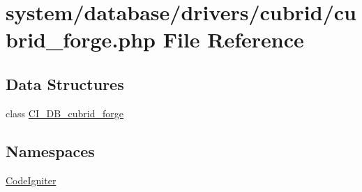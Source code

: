 \hypertarget{cubrid__forge_8php}{}\section{system/database/drivers/cubrid/cubrid\+\_\+forge.php File Reference}
\label{cubrid__forge_8php}
\subsection*{Data Structures}
\begin{DoxyCompactItemize}
\item 
class \mbox{\hyperlink{class_c_i___d_b__cubrid__forge}{C\+I\+\_\+\+D\+B\+\_\+cubrid\+\_\+forge}}
\end{DoxyCompactItemize}
\subsection*{Namespaces}
\begin{DoxyCompactItemize}
\item 
 \mbox{\hyperlink{namespace_code_igniter}{Code\+Igniter}}
\end{DoxyCompactItemize}
